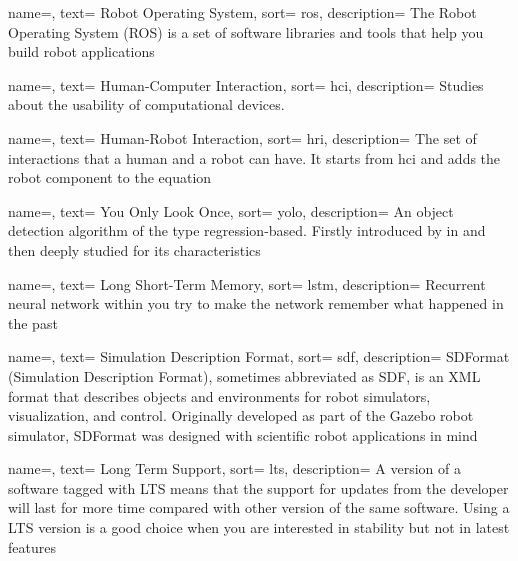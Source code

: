{
  name=,
  text= Robot Operating System,
  sort= ros,
  description= {The Robot Operating System (ROS) is a set of software libraries and tools that help you build robot applications~\cite{site:ros}}
}

{
  name=,
  text= Human-Computer Interaction,
  sort= hci,
  description= {Studies about the usability of computational devices.}
}

{
  name=,
  text= Human-Robot Interaction,
  sort= hri,
  description= {The set of interactions that a human and a robot can have. It starts from \gls{hci} and adds the robot component to the equation}
}

{
  name=,
  text= You Only Look Once,
  sort= yolo,
  description= {An object detection algorithm of the type regression-based. Firstly introduced by \citeauthor{article:yolov1}\cite{article:yolov1} in \citeyear{article:yolov1} and then deeply studied for its characteristics}
}

{
  name=,
  text= Long Short-Term Memory,
  sort= lstm,
  description= {Recurrent neural network within you try to make the network remember what happened in the past}
}


{
  name=,
  text= Simulation Description Format,
  sort= sdf,
  description= {SDFormat (Simulation Description Format), sometimes abbreviated as SDF, is an XML format that describes objects and environments for robot simulators, visualization, and control. Originally developed as part of the Gazebo robot simulator, SDFormat was designed with scientific robot applications in mind}
}


{
  name=,
  text= Long Term Support,
  sort= lts,
  description= {A version of a software tagged with LTS means that the support for updates from the developer will last for more time compared with other version of the same software. Using a LTS version is a good choice when you are interested in stability but not in latest features}
}



